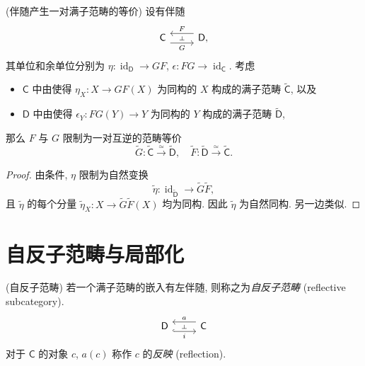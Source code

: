 \begin{prop}
	[label={adjoint-full-subcategory-equivalence}]
	{(伴随产生一对满子范畴的等价)}
	设有伴随
	\[\begin{tikzcd}[ampersand replacement=\&]
		{\mathsf {C}} \& {\mathsf {D},}
		\arrow[""{name=0, anchor=center, inner sep=0}, "F"', shift right=2, from=1-2, to=1-1]
		\arrow[""{name=1, anchor=center, inner sep=0}, "G"', shift right=2, from=1-1, to=1-2]
		\arrow["\dashv"{anchor=center, rotate=-90}, draw=none, from=0, to=1]
	\end{tikzcd}\]
	其单位和余单位分别为
	$\eta \colon \operatorname{id}_{\mathsf D} \to GF$,
	$\epsilon \colon FG \to \operatorname{id}_{\mathsf C}$.
	考虑
	\begin{itemize}
		\item $\mathsf C$ 中由使得 $\eta_X \colon X \to GF(X)$ 为同构的 $X$ 构成的满子范畴 $\widetilde {\mathsf C}$,
		以及
		\item $\mathsf D$ 中由使得 $\epsilon_Y \colon FG(Y)\to Y$ 为同构的 $Y$ 构成的满子范畴 $\widetilde {\mathsf D}$,
	\end{itemize}
	那么 $F$ 与 $G$ 限制为一对互逆的范畴等价
	$$
	\widetilde G\colon \widetilde {\mathsf C} \overset{\simeq}{\to} \widetilde {\mathsf D},\quad
	\widetilde F\colon \widetilde {\mathsf D} \overset{\simeq}{\to} \widetilde {\mathsf C}.
	$$
\end{prop}

\begin{proof}
	由条件, $\eta$ 限制为自然变换
	$$
	\widetilde \eta \colon
	\operatorname{id}_{\widetilde {\mathsf D}} \to \widetilde G \widetilde F,
	$$
	且 $\widetilde \eta$ 的每个分量 ${\widetilde \eta}_{X} \colon X \to \widetilde G \widetilde F (X)$ 均为同构.
	因此 $\widetilde \eta$ 为自然同构. 另一边类似.
\end{proof}

\section{自反子范畴与局部化}

\begin{definition}
	[label={reflective-subcategory}]
	{(自反子范畴)}
	若一个满子范畴的嵌入有左伴随, 则称之为\emph{自反子范畴} (reflective subcategory).
	\[\begin{tikzcd}[ampersand replacement=\&]
		{\mathsf D} \& {\mathsf C}
		\arrow[""{name=0, anchor=center, inner sep=0}, "i"', shift right=2, hook, from=1-1, to=1-2]
		\arrow[""{name=1, anchor=center, inner sep=0}, "a"', shift right=2, from=1-2, to=1-1]
		\arrow["\dashv"{anchor=center, rotate=-90}, draw=none, from=1, to=0]
	\end{tikzcd}\]
	对于 $\mathsf C$ 的对象 $c$, $a(c)$ 称作 $c$ 的\emph{反映} (reflection).
\end{definition}

